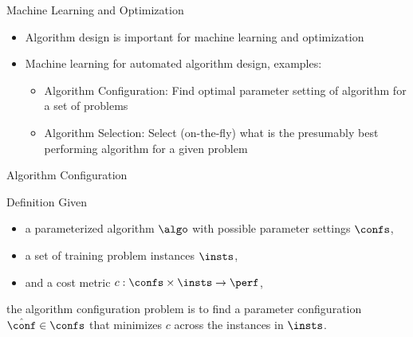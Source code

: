 % 
\begin{frame}[c]{Machine Learning and Optimization}

\begin{itemize} 
  \item Algorithm design is important for machine learning and optimization
  \pause
  \medskip
  \item Machine learning for automated algorithm design, examples:
  \medskip
  \begin{itemize}
    \item \alert{Algorithm Configuration}: Find optimal \alert{parameter setting} of
    algorithm for a set of problems
    \medskip
    \item \alert{Algorithm Selection}: Select (on-the-fly) what is the presumably \alert{best performing algorithm} for a given problem
  \end{itemize}
\end{itemize}


\end{frame}
\begin{frame}[c]{Algorithm Configuration}

\begin{block}{Definition}
Given 
\begin{itemize}
  \item a parameterized algorithm $\algo$ with possible parameter settings $\confs$,
  \item a set of training problem instances $\insts$,
  \item and a cost metric $c: \confs \times \insts \rightarrow \perf$,  
\end{itemize} 
the algorithm configuration problem is 
to find a parameter configuration $\hat{\conf} \in \confs$ 
that minimizes $c$ across the instances in $\insts$.
\end{block}

\bigskip
\pause

\centering
\scalebox{0.75}{

}

\end{frame}
